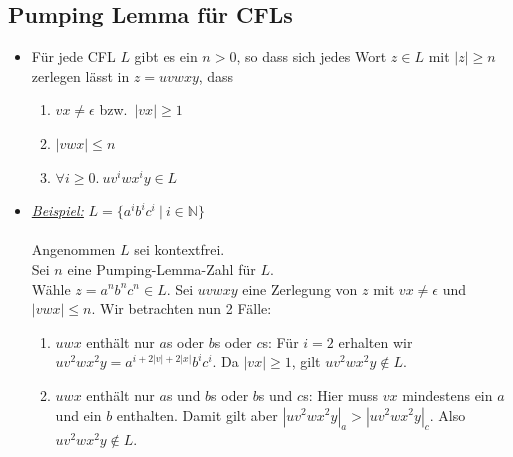 \documentclass[ieeetran]{article}
\begin{document}
\subsection{Pumping Lemma für CFLs} %
\label{sub:pumping_lemma_für_cFL}
\begin{itemize}
  \item Für jede CFL $L$ gibt es ein $n > 0$, so dass sich jedes Wort $z \in L$ mit $|z| \ge n$ zerlegen lässt in $z = uvwxy$, dass
	  \begin{enumerate}
	    \item $vx \neq \epsilon$ bzw.\ $|vx| \ge 1$
	\item $|vwx| \le n$
	\item $\forall i \ge 0. \ uv^iwx^iy \in L$
	  \end{enumerate}

  \item \textit{\underline{Beispiel:}} $L = \{a^ib^ic^i \ | \ i \in \mathbb{N} \}$
\\\\Angenommen $L$ sei kontextfrei.
\\Sei $n$ eine Pumping-Lemma-Zahl für $L$.
\\Wähle $z = a^nb^nc^n \in L$. Sei $uvwxy$ eine Zerlegung von $z$ mit $vx \neq \epsilon$ und $|vwx| \le n$. Wir betrachten nun 2 Fälle:
\begin{enumerate}
\item $uwx$ enthält nur $a$s oder $b$s oder $c$s: Für $i = 2$ erhalten wir $uv^2wx^2y = a^{i + 2|v| + 2|x|}b^ic^i$. Da $|vx| \ge 1$, gilt $uv^2wx^2y \not\in L$.
\item $uwx$ enthält nur $a$s und $b$s oder $b$s und $c$s: Hier muss $vx$ mindestens ein $a$ und ein $b$ enthalten. Damit gilt aber $|uv^2wx^2y|_a > |uv^2wx^2y|_c$. Also $uv^2wx^2y \not\in L$.
\end{enumerate}


\end{itemize}
\end{document}

